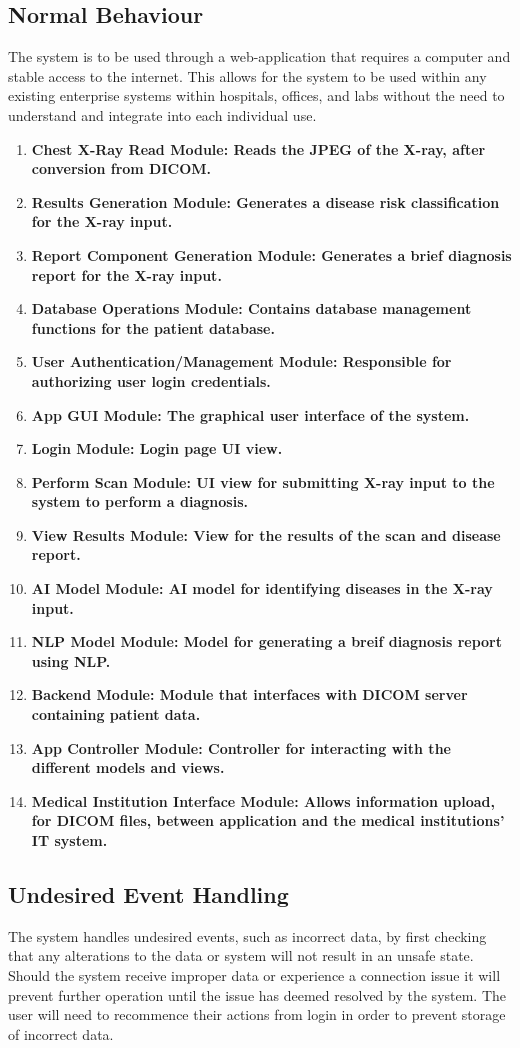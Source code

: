 \documentclass[12pt, titlepage]{article}
\begin{document}
\subsection{Normal Behaviour}
The system is to be used through a web-application that requires a computer and stable access to the internet. This allows for the system to be used within any existing enterprise systems within hospitals, offices, and labs without the need to understand and integrate into each individual use.
\begin{enumerate}
    \item \bf{Chest X-Ray Read Module}: Reads the JPEG of the X-ray, after conversion from DICOM.
    \item \bf{Results Generation Module}: Generates a disease risk classification for the X-ray input.
    \item \bf{Report Component Generation Module}: Generates a brief diagnosis report for the X-ray input.
    \item \bf{Database Operations Module}: Contains database management functions for the patient database.
    \item \bf{User Authentication/Management Module}: Responsible for authorizing user login credentials.
    \item \bf{App GUI Module}: The graphical user interface of the system.
    \item \bf{Login Module}: Login page UI view.
    \item \bf{Perform Scan Module}: UI view for submitting X-ray input to the system to perform a diagnosis.
    \item \bf{View Results Module}: View for the results of the scan and disease report.
    \item \bf{AI Model Module}: AI model for identifying diseases in the X-ray input.
    \item \bf{NLP Model Module}: Model for generating a breif diagnosis report using NLP.
    \item \bf{Backend Module}: Module that interfaces with DICOM server containing patient data.
    \item \bf{App Controller Module}: Controller for interacting with the different models and views.
    \item \bf{Medical Institution Interface Module}: Allows information upload, for DICOM files, between application and the medical institutions' IT system.
\end{enumerate}

\subsection{Undesired Event Handling}
The system handles undesired events, such as incorrect data, by first checking that any alterations to the data or system will not result in an unsafe state. Should the system receive improper data or experience a connection issue it will prevent further operation until the issue has deemed resolved by the system. The user will need to recommence their actions from login in order to prevent storage of incorrect data. 
\end{document}
